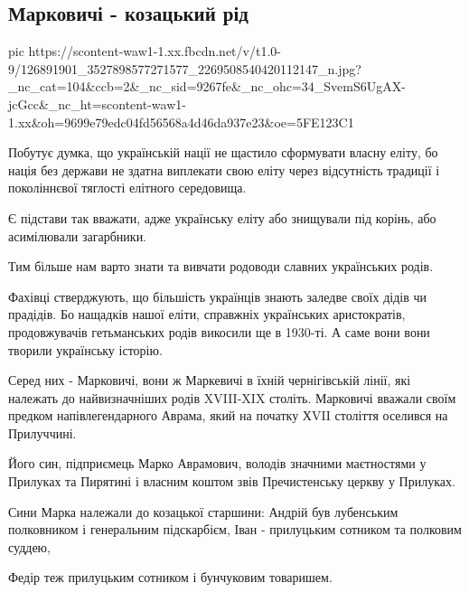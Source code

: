  
 
 

\subsection{Марковичі - козацький рід}
\label{sec:22_11_2020.fb.braty_grim.1.rid}

\ifcmt
pic https://scontent-waw1-1.xx.fbcdn.net/v/t1.0-9/126891901_3527898577271577_2269508540420112147_n.jpg?_nc_cat=104&ccb=2&_nc_sid=9267fe&_nc_ohc=34_SvemS6UgAX-jcGcc&_nc_ht=scontent-waw1-1.xx&oh=9699e79edc04fd56568a4d46da937e23&oe=5FE123C1
\fi

Побутує думка, що українській нації не щастило сформувати власну еліту, бо
нація без держави не здатна виплекати свою еліту через відсутність традиції і
поколіннєвої тяглості елітного середовища. 

Є підстави так вважати, адже українську еліту або знищували під корінь, або
асимілювали загарбники.

Тим більше нам варто знати та вивчати родоводи славних українських родів.

Фахівці стверджують, що більшість українців знають заледве своїх дідів чи
прадідів. Бо нащадків нашої еліти, справжніх українських аристократів,
продовжувачів гетьманських родів викосили ще в 1930-ті. А саме вони вони
творили українську історію.

Серед них - Марковичі, вони ж Маркевичі в їхній чернігівській лінії, які
належать до найвизначніших родів XVIII-XIX століть.  Марковичі вважали своїм
предком напівлегендарного Аврама, який на початку ХVII століття оселився на
Прилуччині.

Його син, підприємець Марко Аврамович, володів значними маєтностями у Прилуках
та Пирятині і власним коштом звів Пречистенську церкву у Прилуках.

Сини Марка належали до козацької старшини: Андрій був лубенським полковником і
генеральним підскарбієм, Іван - прилуцьким сотником та полковим суддею, 

Федір теж прилуцьким сотником і бунчуковим товаришем.

